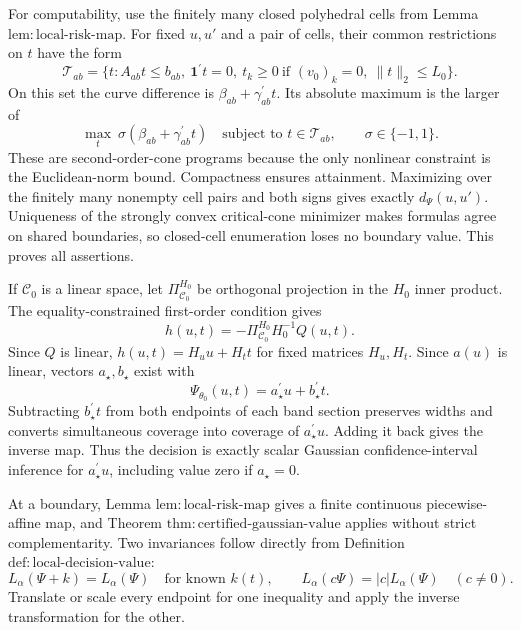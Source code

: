 For computability, use the finitely many closed polyhedral cells from Lemma \(\mathrm{lem:local\mbox{-}risk\mbox{-}map}\).  For fixed \(u,u'\) and a pair of cells, their common restrictions on \(t\) have the form
\[
 \mathcal T_{ab}=
 \{t:A_{ab}t\leq b_{ab},\
 \mathbf1^\prime t=0,\
 t_k\geq0\ \text{if }(v_0)_k=0,\
 \lVert t\rVert_2\leq L_0\}.
\tag{15}
\]
On this set the curve difference is \(\beta_{ab}+\gamma_{ab}^\prime t\).  Its absolute maximum is the larger of
\[
 \max_t\ \sigma(\beta_{ab}+\gamma_{ab}^\prime t)
 \quad\text{subject to }t\in\mathcal T_{ab},
 \qquad \sigma\in\{-1,1\}.
\tag{16}
\]
These are second-order-cone programs because the only nonlinear constraint is the Euclidean-norm bound.  Compactness ensures attainment.  Maximizing over the finitely many nonempty cell pairs and both signs gives exactly \(d_\Psi(u,u')\).  Uniqueness of the strongly convex critical-cone minimizer makes formulas agree on shared boundaries, so closed-cell enumeration loses no boundary value.  This proves all assertions.

If \(\mathcal C_0\) is a linear space, let \(\Pi_{\mathcal C_0}^{H_0}\) be orthogonal projection in the \(H_0\) inner product.  The equality-constrained first-order condition gives
\[
 h(u,t)=-\Pi_{\mathcal C_0}^{H_0}H_0^{-1}Q(u,t).
\tag{17}
\]
Since \(Q\) is linear, \(h(u,t)=H_uu+H_tt\) for fixed matrices \(H_u,H_t\).  Since \(a(u)\) is linear, vectors \(a_\star,b_\star\) exist with
\[
 \Psi_{\theta_0}(u,t)=a_\star^\prime u+b_\star^\prime t.
\tag{18}
\]
Subtracting \(b_\star^\prime t\) from both endpoints of each band section preserves widths and converts simultaneous coverage into coverage of \(a_\star^\prime u\).  Adding it back gives the inverse map.  Thus the decision is exactly scalar Gaussian confidence-interval inference for \(a_\star^\prime u\), including value zero if \(a_\star=0\).

At a boundary, Lemma \(\mathrm{lem:local\mbox{-}risk\mbox{-}map}\) gives a finite continuous piecewise-affine map, and Theorem \(\mathrm{thm:certified\mbox{-}gaussian\mbox{-}value}\) applies without strict complementarity.  Two invariances follow directly from Definition \(\mathrm{def:local\mbox{-}decision\mbox{-}value}\):
\[
 L_\alpha(\Psi+k)=L_\alpha(\Psi)
 \quad\text{for known }k(t),\qquad
 L_\alpha(c\Psi)=|c|L_\alpha(\Psi)\quad(c\neq0).
\tag{19}
\]
Translate or scale every endpoint for one inequality and apply the inverse transformation for the other.

